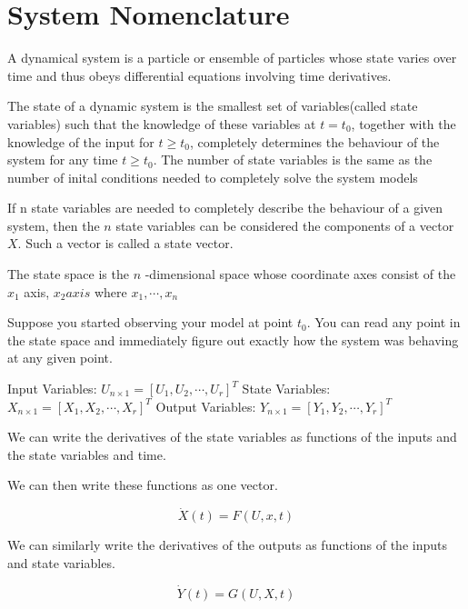 \documentclass[11pt]{report}
\begin{document}
\section{System Nomenclature}
\label{sec:orgab3300b}
\begin{definition}
A dynamical system is a particle or ensemble of particles whose state varies over time and thus obeys differential equations involving time derivatives.
\end{definition}
\begin{definition}
The state of a dynamic system is the smallest set of variables(called state variables) such that the knowledge of these variables at \(t=t_0\), together with the knowledge of the input for \(t\geq t_0\), completely determines the behaviour of the system for any time \(t \ge t_0\). The number of state variables is the same as the number of inital conditions needed to completely solve the system models
\end{definition}
\begin{definition}
If n state variables are needed to completely describe the behaviour of a given system, then the \(n\) state variables can be considered the components of a vector \(X\). Such a vector is called a state vector.
\end{definition}

\begin{definition}
The state space is the  \(n\) -dimensional space whose coordinate axes consist of the \(x_1\) axis, \(x_2 axis\) where \(x_1, \cdots , x_n\)
\end{definition}

Suppose you started observing your model at point \(t_0\). You can read any point in the state space and immediately figure out exactly how the system was behaving at any given point.


Input Variables: \(U_{n\times1} = [U_1, U_2, \cdots, U_r]^T\)
State Variables: \(X_{n\times1} = [X_1, X_2, \cdots, X_r]^T\)
Output Variables: \(Y_{n\times1} = [Y_1, Y_2, \cdots, Y_r]^T\)

We can write the derivatives of the state variables as functions of the inputs and the state variables and time.

We can then write these functions as one vector.

\[
\dot{X}(t) = F(U,x,t)
\]

We can similarly write the derivatives of the outputs as functions of the inputs and state variables.

\[
\dot{Y}(t) = G(U,X,t)
\]
\end{document}
